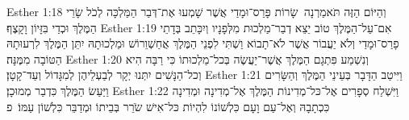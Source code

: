 Esther 1:18	וְהַיּוֹם הַזֶּה תֹּאמַרְנָה  שָׂרוֹת פָּרַס־וּמָדַי אֲשֶׁר שָׁמְעוּ אֶת־דְּבַר הַמַּלְכָּה לְכֹל שָׂרֵי הַמֶּלֶךְ וּכְדַי בִּזָּיוֹן וָקָצֶף׃
Esther 1:19	אִם־עַל־הַמֶּלֶךְ טוֹב יֵצֵא דְבַר־מַלְכוּת מִלְּפָנָיו וְיִכָּתֵב בְּדָתֵי פָרַס־וּמָדַי וְלֹא יַעֲבוֹר אֲשֶׁר לֹא־תָבוֹא וַשְׁתִּי לִפְנֵי הַמֶּלֶךְ אֲחַשְׁוֵרוֹשׁ וּמַלְכוּתָהּ יִתֵּן הַמֶּלֶךְ לִרְעוּתָהּ הַטּוֹבָה מִמֶּנָּה׃
Esther 1:20	וְנִשְׁמַע פִּתְגָם הַמֶּלֶךְ אֲשֶׁר־יַעֲשֶׂה בְּכל־מַלְכוּתוֹ כִּי רַבָּה הִיא וְכל־הַנָּשִׁים יִתְּנוּ יְקָר לְבַעְלֵיהֶן לְמִגָּדוֹל וְעַד־קָטָן׃
Esther 1:21	וַיִּיטַב הַדָּבָר בְּעֵינֵי הַמֶּלֶךְ וְהַשָּׂרִים וַיַּעַשׂ הַמֶּלֶךְ כִּדְבַר מְמוּכָן׃
Esther 1:22	וַיִּשְׁלַח סְפָרִים אֶל־כּל־מְדִינוֹת הַמֶּלֶךְ אֶל־מְדִינָה וּמְדִינָה כִּכְתָבָהּ וְאֶל־עַם וָעָם כִּלְשׁוֹנוֹ לִהְיוֹת כּל־אִישׁ שֹׂרֵר בְּבֵיתוֹ וּמְדַבֵּר כִּלְשׁוֹן עַמּוֹ׃ {פ}
